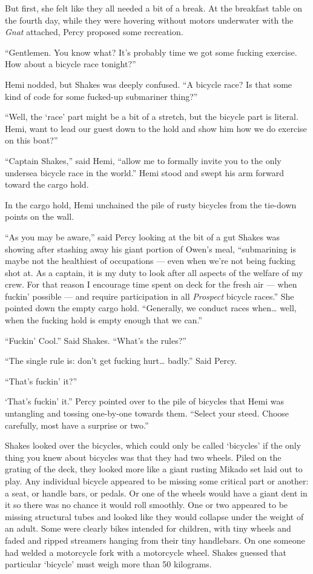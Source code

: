 \documentclass[
]{scrbook}
\begin{document}
But first, she felt like they all needed a bit of a break. At the
breakfast table on the fourth day, while they were hovering without
motors underwater with the \emph{Gnat} attached, Percy proposed some
recreation.

``Gentlemen. You know what? It's probably time we got some fucking
exercise. How about a bicycle race tonight?''

Hemi nodded, but Shakes was deeply confused. ``A bicycle race? Is that
some kind of code for some fucked-up submariner thing?''

``Well, the `race' part might be a bit of a stretch, but the bicycle
part is literal. Hemi, want to lead our guest down to the hold and show
him how we do exercise on this boat?''

``Captain Shakes,'' said Hemi, ``allow me to formally invite you to the
only undersea bicycle race in the world.'' Hemi stood and swept his arm
forward toward the cargo hold.

In the cargo hold, Hemi unchained the pile of rusty bicycles from the
tie-down points on the wall.

``As you may be aware,'' said Percy looking at the bit of a gut Shakes
was showing after stashing away his giant portion of Owen's meal,
``submarining is maybe not the healthiest of occupations --- even when
we're not being fucking shot at. As a captain, it is my duty to look
after all aspects of the welfare of my crew. For that reason I encourage
time spent on deck for the fresh air --- when fuckin' possible --- and
require participation in all \emph{Prospect} bicycle races.'' She
pointed down the empty cargo hold. ``Generally, we conduct races
when\ldots{} well, when the fucking hold is empty enough that we can.''

``Fuckin' Cool.'' Said Shakes. ``What's the rules?''

``The single rule is: don't get fucking hurt\ldots{} badly.'' Said
Percy.

``That's fuckin' it?''

`That's fuckin' it.'' Percy pointed over to the pile of bicycles that
Hemi was untangling and tossing one-by-one towards them. ``Select your
steed. Choose carefully, most have a surprise or two.''

Shakes looked over the bicycles, which could only be called `bicycles'
if the only thing you knew about bicycles was that they had two wheels.
Piled on the grating of the deck, they looked more like a giant rusting
Mikado set laid out to play. Any individual bicycle appeared to be
missing some critical part or another: a seat, or handle bars, or
pedals. Or one of the wheels would have a giant dent in it so there was
no chance it would roll smoothly. One or two appeared to be missing
structural tubes and looked like they would collapse under the weight of
an adult. Some were clearly bikes intended for children, with tiny
wheels and faded and ripped streamers hanging from their tiny
handlebars. On one someone had welded a motorcycle fork with a
motorcycle wheel. Shakes guessed that particular `bicycle' must weigh
more than 50 kilograms.
\end{document}
